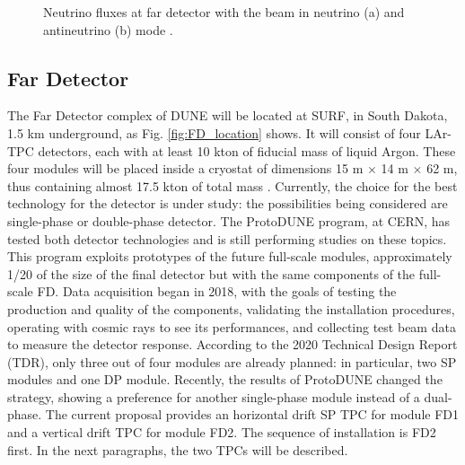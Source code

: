 \begin{figure}
    \centering
    \hfil
    \caption{Neutrino fluxes at far detector with the beam in neutrino (a) and antineutrino (b) mode \cite{dunelbnf_cdrvol2}.}
    \label{fig:nu_fluxes}
\end{figure}

\subsection{Far Detector}

\titleformat{\subsubsection}{\normalfont\normalsize\bfseries}{\thesubsubsection}{1em}{}

The Far Detector complex of DUNE will be located at SURF, in South Dakota, 1.5 km underground, as Fig. \ref{fig:FD_location} shows. It will consist of four LAr-TPC detectors, each with at least 10 kton of fiducial mass of liquid Argon. These four modules will be placed inside a cryostat of dimensions 15 m $\times$ 14 m $\times$ 62 m, thus containing almost 17.5 kton of total mass \cite{fd_tdr_vol1}. 
Currently, the choice for the best technology for the detector is under study: the possibilities being considered are single-phase or double-phase detector. The ProtoDUNE program, at CERN, has tested both detector technologies and is still performing studies on these topics. This program exploits prototypes of the future full-scale modules, approximately 1/20 of the size of the final detector but with the same components of the full-scale FD. Data acquisition began in 2018, with the goals of testing the production and quality of the components, validating the installation procedures, operating with cosmic rays to see its performances, and collecting test beam data to measure the detector response. 
According to the 2020 Technical Design Report (TDR), only three out of four modules are already planned: in particular, two SP modules and one DP module. Recently, the results of ProtoDUNE changed the strategy, showing a preference for another single-phase module instead of a dual-phase. The current proposal provides an horizontal drift SP TPC for module FD1 and a vertical drift TPC for module FD2. The sequence of installation is FD2 first.
In the next paragraphs, the two TPCs will be described.

